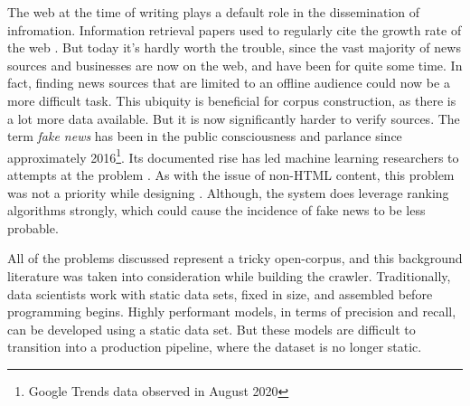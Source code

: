 The web at the time of writing plays a default role in the dissemination of infromation.
Information retrieval papers used to regularly cite the growth rate of the
web \cite{mcbryan1994}. But today it's hardly worth the
trouble, since the vast majority of news sources and businesses are now on the
web, and have been for quite some time.  In fact, finding news sources that are limited to an offline
audience could now be a more difficult task.  This ubiquity
is beneficial for corpus construction, as there is a lot more
data available.  But it is now significantly harder to verify
sources.  The term {\it fake news} has been in the public consciousness
and parlance since approximately 2016\footnote{Google
Trends data observed in August 2020}.  Its documented rise
has led machine learning researchers to attempts
at the problem \cite{shu2017}.  As with the issue of non-HTML
content, this problem was not a priority while designing \nr{}.
Although, the system does leverage ranking algorithms strongly,
which could cause the incidence of fake news to be less
probable.

All of the problems discussed represent a tricky open-corpus,
and this background literature was taken into consideration
while building the crawler.  Traditionally, data scientists work
with static data sets, fixed in size, and assembled before
programming begins.  Highly performant models, in terms of
precision and recall, can be developed using a static data
set.  But these models are difficult to transition into a
production pipeline, where the dataset is no longer static.